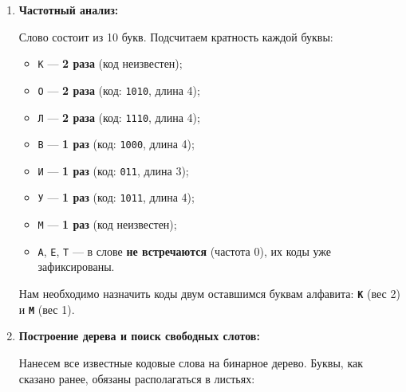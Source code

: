 \documentclass[11pt,a4paper]{article}
\begin{document}
\begin{enumerate}
    \item \textbf{Частотный анализ:}
    
    Слово состоит из 10 букв. Подсчитаем кратность каждой буквы:
    \begin{itemize}
        \item \texttt{К} --- \textbf{2 раза} (код неизвестен);
        \item \texttt{О} --- \textbf{2 раза} (код: \texttt{1010}, длина 4);
        \item \texttt{Л} --- \textbf{2 раза} (код: \texttt{1110}, длина 4);
        \item \texttt{В} --- \textbf{1 раз} (код: \texttt{1000}, длина 4);
        \item \texttt{И} --- \textbf{1 раз} (код: \texttt{011}, длина 3);
        \item \texttt{У} --- \textbf{1 раз} (код: \texttt{1011}, длина 4);
        \item \texttt{М} --- \textbf{1 раз} (код неизвестен);
        \item \texttt{А}, \texttt{Е}, \texttt{Т} --- в слове \textbf{не встречаются} (частота 0), их коды уже зафиксированы.
    \end{itemize}

    Нам необходимо назначить коды двум оставшимся буквам алфавита: \textbf{\texttt{К}} (вес 2) и \textbf{\texttt{М}} (вес 1).

    \item \textbf{Построение дерева и поиск свободных слотов:}

    Нанесем все известные кодовые слова на бинарное дерево. Буквы, как сказано ранее, обязаны располагаться в листьях:


\end{enumerate}
\end{document}
